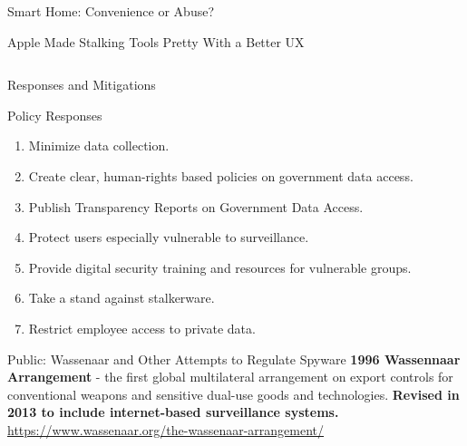\documentclass[nobackground,dvipsnames,table]{beamer}
\begin{document}
\begin{frame}{Smart Home: Convenience or Abuse?}
\end{frame}

\begin{frame}{Apple Made Stalking Tools Pretty With a Better UX}
    \begin{columns}
    \end{columns}
\end{frame}

\begin{frame}{}%
    Responses and Mitigations
\end{frame}

\begin{frame}{Policy Responses}
    \begin{enumerate}
        \item Minimize data collection.
        \item Create clear, human-rights based policies on government data access.
        \item Publish Transparency Reports on Government Data Access.
        \item Protect users especially vulnerable to surveillance.
        \item Provide digital security training and resources for vulnerable groups.
        \item Take a stand against stalkerware.
        \item Restrict employee access to private data.
    \end{enumerate}
\end{frame}

\begin{frame}{Public: Wassenaar and Other Attempts to Regulate Spyware}
    \textbf{1996 Wassennaar Arrangement} - the first global multilateral arrangement on export controls for conventional weapons and sensitive dual-use goods and technologies. \textbf{Revised in 2013 to include internet-based surveillance systems.}\\
    \footnotesize
    \href{wassenaar.org}{https://www.wassenaar.org/the-wassenaar-arrangement/}
    \begin{columns}
    \end{columns}
\end{frame}
\end{document}
